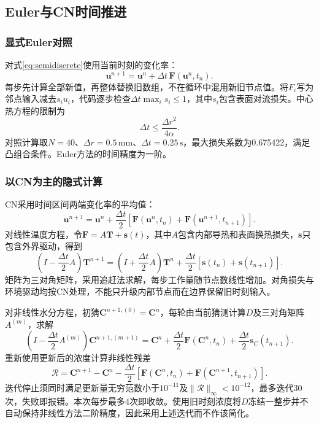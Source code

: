 \documentclass[UTF8,a4paper,11pt]{ctexart}
\begin{document}
\subsection{Euler与CN时间推进}
\subsubsection{显式Euler对照}
对式\eqref{eq:semidiscrete}使用当前时刻的变化率：
\begin{equation}
 \boldsymbol u^{n+1}=\boldsymbol u^n+\Delta t\,\boldsymbol F(\boldsymbol u^n,t_n).
\end{equation}
每步先计算全部新值，再整体替换旧数组，不在循环中混用新旧节点值。将$F_i$写为邻点输入减去$s_i u_i$，代码逐步检查$\Delta t\max_i s_i\le1$，其中$s_i$包含表面对流损失。中心热方程的限制为
\begin{equation}
 \Delta t\le\frac{\Delta r^2}{4\alpha}.
\end{equation}
对照计算取$N=40$、$\Delta r=0.5\,\mathrm{mm}$、$\Delta t=0.25\,\mathrm s$，最大损失系数为0.675422，满足凸组合条件。Euler方法的时间精度为一阶。

\subsubsection{以CN为主的隐式计算}
CN采用时间区间两端变化率的平均值：
\begin{equation}\label{eq:cn}
 \boldsymbol u^{n+1}=\boldsymbol u^n+
 \frac{\Delta t}{2}\left[\boldsymbol F(\boldsymbol u^n,t_n)+
 \boldsymbol F(\boldsymbol u^{n+1},t_{n+1})\right].
\end{equation}
对线性温度方程，令$\boldsymbol F=A\boldsymbol T+\boldsymbol s(t)$，其中$A$包含内部导热和表面换热损失，$\boldsymbol s$只包含外界驱动，得到
\begin{equation}
 \left(I-\frac{\Delta t}{2}A\right)\boldsymbol T^{n+1}
 =\left(I+\frac{\Delta t}{2}A\right)\boldsymbol T^n
 +\frac{\Delta t}{2}\left[\boldsymbol s(t_n)+\boldsymbol s(t_{n+1})\right].
\end{equation}
矩阵为三对角矩阵，采用追赶法求解，每步工作量随节点数线性增加。对角损失与环境驱动均按CN处理，不能只升级内部节点而在边界保留旧时刻输入。

对非线性水分方程，初猜$\boldsymbol C^{n+1,(0)}=\boldsymbol C^n$，每轮由当前猜测计算$D$及三对角矩阵$A^{(m)}$，求解
\begin{equation}
 \left(I-\frac{\Delta t}{2}A^{(m)}\right)\boldsymbol C^{n+1,(m+1)}
 =\boldsymbol C^n+\frac{\Delta t}{2}\boldsymbol F(\boldsymbol C^n,t_n)
 +\frac{\Delta t}{2}\boldsymbol s_C(t_{n+1}).
\end{equation}
重新使用更新后的浓度计算非线性残差
\begin{equation}
 \boldsymbol{\mathcal R}=\boldsymbol C^{n+1}-\boldsymbol C^n-
 \frac{\Delta t}{2}\left[\boldsymbol F(\boldsymbol C^n,t_n)+
 \boldsymbol F(\boldsymbol C^{n+1},t_{n+1})\right].
\end{equation}
迭代停止须同时满足更新量无穷范数小于$10^{-11}$及$\|\boldsymbol{\mathcal R}\|_\infty<10^{-12}$，最多迭代30次，失败即报错。本次每步最多4次即收敛。使用旧时刻浓度将$D$冻结一整步并不自动保持非线性方法二阶精度，因此采用上述迭代而不作该简化。
\end{document}
